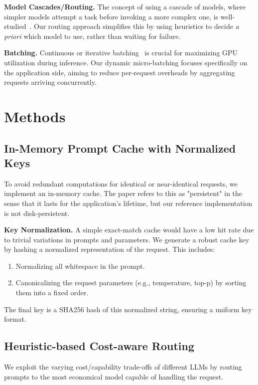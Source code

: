 \documentclass[11pt]{article}
\begin{document}
\noindent\textbf{Model Cascades/Routing.} The concept of using a cascade of models, where simpler models attempt a task before invoking a more complex one, is well-studied~\cite{chen2023frugalgpt}. Our routing approach simplifies this by using heuristics to decide \emph{a priori} which model to use, rather than waiting for failure.

\noindent\textbf{Batching.} Continuous or iterative batching~\cite{pope2022efficiently} is crucial for maximizing GPU utilization during inference. Our dynamic micro-batching focuses specifically on the application side, aiming to reduce per-request overheads by aggregating requests arriving concurrently.

\section{Methods}

\subsection{In-Memory Prompt Cache with Normalized Keys}
To avoid redundant computations for identical or near-identical requests, we implement an in-memory cache. The paper refers to this as "persistent" in the sense that it lasts for the application's lifetime, but our reference implementation is not disk-persistent.

\noindent\textbf{Key Normalization.} A simple exact-match cache would have a low hit rate due to trivial variations in prompts and parameters. We generate a robust cache key by hashing a normalized representation of the request. This includes:
\begin{enumerate}
    \item Normalizing all whitespace in the prompt.
    \item Canonicalizing the request parameters (e.g., temperature, top-p) by sorting them into a fixed order.
\end{enumerate}
The final key is a SHA256 hash of this normalized string, ensuring a uniform key format.

\subsection{Heuristic-based Cost-aware Routing}
We exploit the varying cost/capability trade-offs of different LLMs by routing prompts to the most economical model capable of handling the request.
\end{document}
